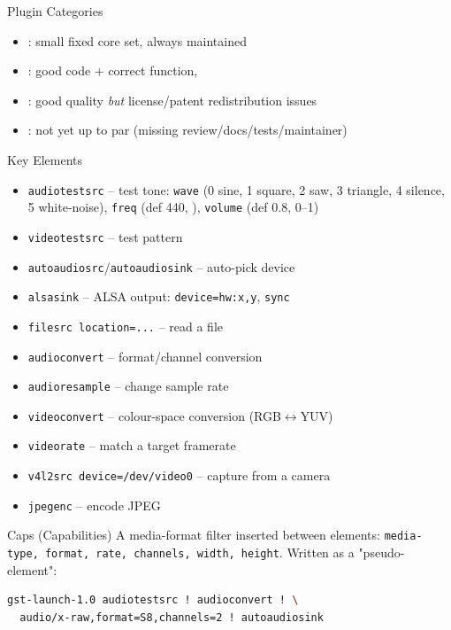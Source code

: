 \begin{definition}{Plugin Categories}
    \begin{itemize}
        \item {}: small fixed core set, always maintained
        \item {}: good code + correct function, 
        \item {}: good quality \emph{but} license/patent redistribution issues
        \item {}: not yet up to par (missing review/docs/tests/maintainer)
    \end{itemize}
\end{definition}

\begin{definition}{Key Elements}
    \begin{itemize}
        \item \texttt{audiotestsrc} -- test tone: \texttt{wave} (0 sine, 1 square,
              2 saw, 3 triangle, 4 silence, 5 white-noise), \texttt{freq} (def 440,
              ), \texttt{volume} (def 0.8, 0--1)
        \item \texttt{videotestsrc} -- test pattern
        \item \texttt{autoaudiosrc}/\texttt{autoaudiosink} -- auto-pick device
        \item \texttt{alsasink} -- ALSA output: \texttt{device=hw:x,y}, \texttt{sync}
        \item \texttt{filesrc location=...} -- read a file
        \item \texttt{audioconvert} -- format/channel conversion
        \item \texttt{audioresample} -- change sample rate
        \item \texttt{videoconvert} -- colour-space conversion (RGB$\leftrightarrow$YUV)
        \item \texttt{videorate} -- match a target framerate
        \item \texttt{v4l2src device=/dev/video0} -- capture from a camera
        \item \texttt{jpegenc} -- encode JPEG
    \end{itemize}
\end{definition}

\begin{definition}{Caps (Capabilities)}
    A media-format filter inserted between elements: \texttt{media-type, format, rate,
    channels, width, height}. Written as a "pseudo-element":
\begin{lstlisting}[language=bash, style=basesmol, aboveskip=2pt, belowskip=2pt]
gst-launch-1.0 audiotestsrc ! audioconvert ! \
  audio/x-raw,format=S8,channels=2 ! autoaudiosink
\end{lstlisting}
\end{definition}

